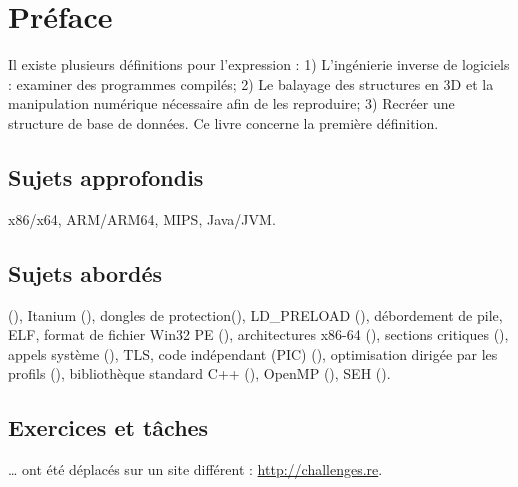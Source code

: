 \section*{Préface}

Il existe plusieurs définitions pour l'expression  :
1) L'ingénierie inverse de logiciels : examiner des programmes compilés;
2) Le balayage des structures en 3D et la manipulation numérique nécessaire afin de les reproduire;
3) Recréer une structure de base de données.
Ce livre concerne la première définition.

\subsection*{Sujets approfondis}

x86/x64, ARM/ARM64, MIPS, Java/JVM.

\subsection*{Sujets abordés}

\oracle (),
Itanium (),
dongles de protection(), 
LD\_PRELOAD (),
débordement de pile,
\ac{ELF},
format de fichier Win32 PE (),
architectures x86-64 (),
sections critiques (),
appels système (), 
\ac{TLS},
code indépendant (\ac{PIC}) (), 
optimisation dirigée par les profils (),
bibliothèque standard C++ (),
OpenMP (),
SEH ().

\subsection*{Exercices et tâches}

\dots 
ont été déplacés sur un site différent : \url{http://challenges.re}.

